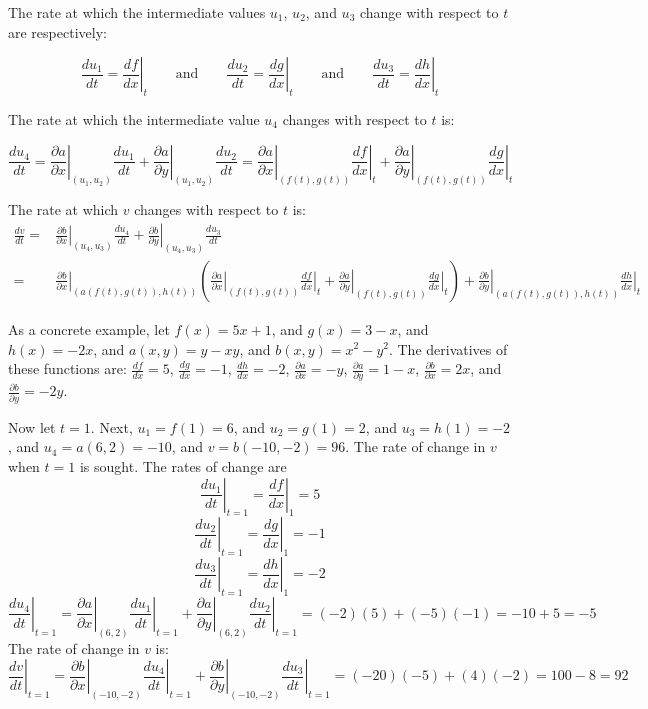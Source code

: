 \documentclass{article}
\begin{document}
The rate at which the intermediate values \(u_1\), \(u_2\), and \(u_3\) change with respect to \(t\) are respectively: 

\[\frac{du_1}{dt} = \left.\frac{df}{dx}\right|_t \quad\quad\text{and}\quad\quad \frac{du_2}{dt} = \left.\frac{dg}{dx}\right|_t \quad\quad\text{and}\quad\quad \frac{du_3}{dt} = \left.\frac{dh}{dx}\right|_t\]

The rate at which the intermediate value \(u_4\) changes with respect to \(t\) is:

\[\frac{du_4}{dt} = \left.\frac{\partial a}{\partial x}\right|_{(u_1, u_2)} \frac{du_1}{dt} + \left.\frac{\partial a}{\partial y}\right|_{(u_1, u_2)} \frac{du_2}{dt} 
= \left.\frac{\partial a}{\partial x}\right|_{(f(t), g(t))} \left.\frac{df}{dx}\right|_t + \left.\frac{\partial a}{\partial y}\right|_{(f(t), g(t))} \left.\frac{dg}{dx}\right|_t\]

The rate at which \(v\) changes with respect to \(t\) is:
\begin{align*}
\frac{dv}{dt} = & \left.\frac{\partial b}{\partial x}\right|_{(u_4, u_3)} \frac{du_4}{dt} + \left.\frac{\partial b}{\partial y}\right|_{(u_4, u_3)} \frac{du_3}{dt} \\
= & \left.\frac{\partial b}{\partial x}\right|_{(a(f(t),g(t)), h(t))} \left(\left.\frac{\partial a}{\partial x}\right|_{(f(t), g(t))} \left.\frac{df}{dx}\right|_t + \left.\frac{\partial a}{\partial y}\right|_{(f(t), g(t))} \left.\frac{dg}{dx}\right|_t\right) + \left.\frac{\partial b}{\partial y}\right|_{(a(f(t),g(t)), h(t))} \left.\frac{dh}{dx}\right|_t
\end{align*}

As a concrete example, let \(f(x) = 5x + 1\), and \(g(x) = 3 - x\), and \(h(x) = -2x\), and \(a(x, y) = y - xy\), and \(b(x, y) = x^2 - y^2\). The derivatives of these functions are: \(\frac{df}{dx} = 5\), \(\frac{dg}{dx} = -1\), \(\frac{dh}{dx} = -2\), \(\frac{\partial a}{\partial x} = -y\), \(\frac{\partial a}{\partial y} = 1 - x\), \(\frac{\partial b}{\partial x} = 2x\), and \(\frac{\partial b}{\partial y} = -2y\). 

Now let \(t = 1\). Next, \(u_1 = f(1) = 6\), and \(u_2 = g(1) = 2\), and \(u_3 = h(1) = -2\), and \(u_4 = a(6, 2) = -10\), and \(v = b(-10, -2) = 96\). The rate of change in \(v\) when \(t = 1\) is sought. The rates of change are 
\[\left.\frac{du_1}{dt}\right|_{t = 1} = \left.\frac{df}{dx}\right|_1 = 5\] 
\[\left.\frac{du_2}{dt}\right|_{t = 1} = \left.\frac{dg}{dx}\right|_1 = -1\] 
\[\left.\frac{du_3}{dt}\right|_{t = 1} = \left.\frac{dh}{dx}\right|_1 = -2\]
\[\left.\frac{du_4}{dt}\right|_{t = 1} = \left.\frac{\partial a}{\partial x}\right|_{(6, 2)} \left.\frac{du_1}{dt}\right|_{t = 1} + \left.\frac{\partial a}{\partial y}\right|_{(6, 2)} \left.\frac{du_2}{dt}\right|_{t = 1} = (-2)(5) + (-5)(-1) = -10 + 5 = -5\] 
The rate of change in \(v\) is: 
\[\left.\frac{dv}{dt}\right|_{t = 1} = \left.\frac{\partial b}{\partial x}\right|_{(-10, -2)} \left.\frac{du_4}{dt}\right|_{t = 1} + \left.\frac{\partial b}{\partial y}\right|_{(-10, -2)} \left.\frac{du_3}{dt}\right|_{t = 1} = (-20)(-5) + (4)(-2) = 100 - 8 = 92\]   
\end{document}
